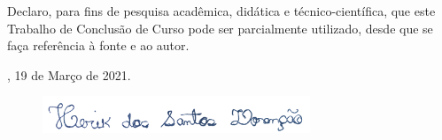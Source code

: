 \begin{declaracaodoautor}

  \vspace*{1.5cm}

  Declaro, para fins de pesquisa acadêmica, didática e
  técnico-científica, que este Trabalho de Conclusão de Curso pode ser
  parcialmente utilizado, desde que se faça referência à fonte e ao
  autor.

  \vspace*{2.5cm}

  \centering

  \imprimirlocal, 19 de Março de 2021.

  \vspace*{2.5cm}

\begin{figure}[H]
    \centering %
    \advance\rightskip-0.5cm
    \includegraphics[width=8cm]{imagens/assinatura.png} %
  \end{figure}
  
  \imprimirautor

  \vspace*{\fill}
  
\end{declaracaodoautor}
